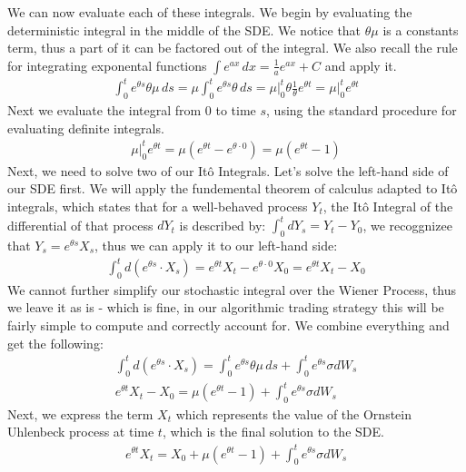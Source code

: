 \documentclass{article}
\begin{document}
\begin{spacing}{2.0}
We can now evaluate each of these integrals. We begin by evaluating the deterministic integral in the middle of the SDE. We notice that $\theta \mu$ is a constants term, thus
a part of it can be factored out of the integral. We also recall the rule for integrating exponental functions $\int e^{ax} \, dx = \frac{1}{a}e^{ax} + C$ and apply it.
\begin{gather*}
    \int_{0}^{t} e^{\theta s} \theta \mu \, ds = \mu \int_{0}^{t} e^{\theta s} \theta \, ds = \mu \bigg|_{0}^{t} \theta \frac{1}{\theta} e^{\theta t} = \mu \bigg|_{0}^{t} e^{\theta t}
\end{gather*}
Next we evaluate the integral from $0$ to time $s$, using the standard procedure for evaluating definite integrals.
\begin{gather*}
    \mu \bigg|_{0}^{t} e^{\theta t} = \mu \left ( e^{\theta t} - e^{\theta \cdot 0} \right ) = \mu \left ( e^{\theta t} - 1 \right )
\end{gather*}
Next, we need to solve two of our Itô Integrals. Let's solve the left-hand side of our SDE first. We will apply the fundemental theorem of calculus adapted to Itô integrals, which states
that for a well-behaved process $Y_{t}$, the Itô Integral of the differential of that process $dY_{t}$ is described by: $\int_{0}^{t} dY_{s} = Y_{t} - Y_{0}$, we recoggnizee that
$Y_{s} = e^{\theta s} X_{s}$, thus we can apply it to our
left-hand side:
\begin{gather*}
    \int_{0}^{t} d\left ( e^{\theta s} \cdot X_{s} \right ) = e^{\theta t}X_{t} - e^{\theta \cdot 0}X_{0} = e^{\theta t}X_{t} - X_{0}
\end{gather*}
We cannot further simplify our stochastic integral over the Wiener Process, thus we leave it as is - which is fine, in our algorithmic trading strategy this will be fairly simple
to compute and correctly account for. We combine everything and get the following:
\begin{gather*}
    \int_{0}^{t} d\left ( e^{\theta s} \cdot X_{s} \right ) = \int_{0}^{t} e^{\theta s} \theta \mu \, ds + \int_{0}^{t} e^{\theta s} \sigma dW_{s} \\
    e^{\theta t}X_{t} - X_{0} = \mu (e^{\theta t} - 1) + \int_{0}^{t} e^{\theta s} \sigma dW_{s}
\end{gather*}
Next, we express the term $X_{t}$ which represents the value of the Ornstein Uhlenbeck process at time $t$, which is the final solution to the SDE.
\begin{gather*}
    e^{\theta t}X_{t} = X_{0} + \mu (e^{\theta t} - 1) + \int_{0}^{t} e^{\theta s} \sigma dW_{s} \\

\end{gather*}
\end{spacing}
\end{document}
